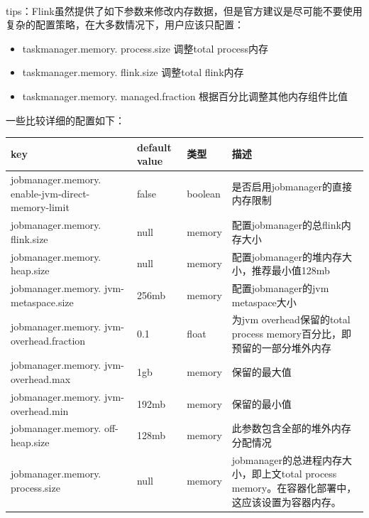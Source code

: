 \documentclass[UTF8]{ctexart}
\begin{document}
    \paragraph*{}
    tips：Flink虽然提供了如下参数来修改内存数据，但是官方建议是尽可能不要使用复杂的配置策略，在大多数情况下，用户应该只配置： 
    \begin{itemize}
        \item taskmanager.memory. process.size 调整total process内存
        \item taskmanager.memory. flink.size 调整total flink内存
        \item taskmanager.memory. managed.fraction 根据百分比调整其他内存组件比值
    \end{itemize}
    一些比较详细的配置如下：
    \newline
    \begin{minipage}[b]{1\linewidth}
        \begin{tabular}{|p{3.5cm}|l|l|p{6cm}|}
            \hline
            key&default value&类型&描述\\
            \hline
            jobmanager.memory. enable-jvm-direct-memory-limit & false & boolean & 是否启用jobmanager的直接内存限制\\
            \hline
            jobmanager.memory. flink.size & null & memory & 配置jobmanager的总flink内存大小\\
            \hline
            jobmanager.memory. heap.size & null & memory & 配置jobmanager的堆内存大小，推荐最小值128mb\\
            \hline
            jobmanager.memory. jvm-metaspace.size & 256mb & memory & 配置jobmanager的jvm metaspace大小\\
            \hline
            jobmanager.memory. jvm-overhead.fraction & 0.1 & float & 为jvm overhead保留的total process memory百分比，即预留的一部分堆外内存\\
            \hline
            jobmanager.memory. jvm-overhead.max & 1gb & memory & 保留的最大值\\
            \hline
            jobmanager.memory. jvm-overhead.min & 192mb & memory & 保留的最小值\\
            \hline
            jobmanager.memory. off-heap.size & 128mb & memory & 此参数包含全部的堆外内存分配情况\\
            \hline
            jobmanager.memory. process.size & null & memory & jobmanager的总进程内存大小，即上文total process memory。在容器化部署中，这应该设置为容器内存。\\
            \hline    
        \end{tabular}
    \end{minipage}
\end{document}
